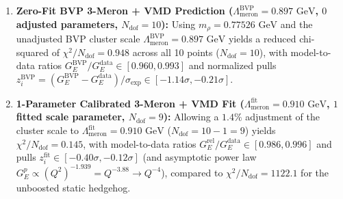 \documentclass[10pt,aps,prd,twocolumn,superscriptaddress,nofootinbib,floatfix,longbibliography,showkeys]{revtex4-2}
\begin{document}
\begin{enumerate}
  \item \textbf{Zero-Fit BVP 3-Meron + VMD Prediction ($\Lambda_{\text{meron}}^{\text{BVP}} = 0.897\text{ GeV}$, $0$ adjusted parameters, $N_{\text{dof}} = 10$):} Using $m_\rho = 0.77526\text{ GeV}$ and the unadjusted BVP cluster scale $\Lambda_{\text{meron}}^{\text{BVP}} = 0.897\text{ GeV}$ yields a reduced chi-squared of \textbf{$\chi^2 / N_{\text{dof}} = 0.948$} across all 10 points ($N_{\text{dof}} = 10$), with model-to-data ratios $G_E^{\text{BVP}}/G_E^{\text{data}} \in [0.960, 0.993]$ and normalized pulls $z_i^{\text{BVP}} = (G_E^{\text{BVP}} - G_E^{\text{data}})/\sigma_{\text{exp}} \in [-1.14\sigma, -0.21\sigma]$.
  \item \textbf{1-Parameter Calibrated 3-Meron + VMD Fit ($\Lambda_{\text{meron}}^{\text{fit}} = 0.910\text{ GeV}$, $1$ fitted scale parameter, $N_{\text{dof}} = 9$):} Allowing a $1.4\%$ adjustment of the cluster scale to $\Lambda_{\text{meron}}^{\text{fit}} = 0.910\text{ GeV}$ ($N_{\text{dof}} = 10 - 1 = 9$) yields \textbf{$\chi^2 / N_{\text{dof}} = 0.145$}, with model-to-data ratios $G_E^{\text{rel}}/G_E^{\text{data}} \in [0.986, 0.996]$ and pulls $z_i^{\text{fit}} \in [-0.40\sigma, -0.12\sigma]$ (and asymptotic power law $G_E^p \propto (Q^2)^{-1.939} = Q^{-3.88} \to Q^{-4}$), compared to $\chi^2 / N_{\text{dof}} = 1122.1$ for the unboosted static hedgehog.

\end{enumerate}
\end{document}
